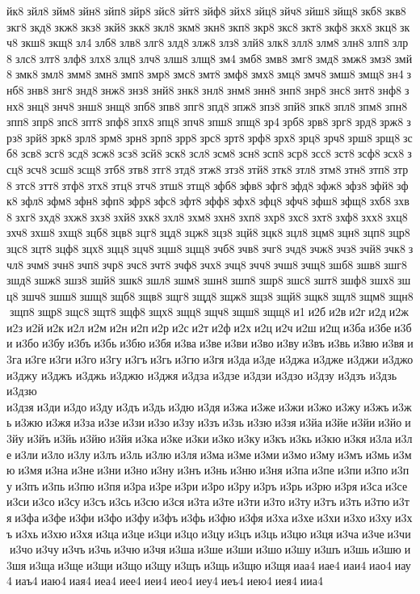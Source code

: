 йк8 зйл8 зйм8 зйн8 зйп8 зйр8 зйс8 зйт8 зйф8 зйх8 зйц8 зйч8 зйш8 зйщ8 зкб8 зкв8 зкг8 зкд8 зкж8 зкз8 зкй8 зкк8 зкл8 зкм8 зкн8 зкп8 зкр8 зкс8 зкт8 зкф8 зкх8 зкц8 зкч8 зкш8 зкщ8 зл4 злб8 злв8 злг8 злд8 злж8 злз8 злй8 злк8 злл8 злм8 злн8 злп8 злр8 злс8 злт8 злф8 злх8 злц8 злч8 злш8 злщ8 зм4 змб8 змв8 змг8 змд8 змж8 змз8 змй8 змк8 змл8 змм8 змн8 змп8 змр8 змс8 змт8 змф8 змх8 змц8 змч8 змш8 змщ8 зн4 знб8 знв8 знг8 знд8 знж8 знз8 знй8 знк8 знл8 знм8 знн8 знп8 знр8 знс8 знт8 знф8 знх8 знц8 знч8 знш8 знщ8 зпб8 зпв8 зпг8 зпд8 зпж8 зпз8 зпй8 зпк8 зпл8 зпм8 зпн8 зпп8 зпр8 зпс8 зпт8 зпф8 зпх8 зпц8 зпч8 зпш8 зпщ8 зр4 зрб8 зрв8 зрг8 зрд8 зрж8 зрз8 зрй8 зрк8 зрл8 зрм8 зрн8 зрп8 зрр8 зрс8 зрт8 зрф8 зрх8 зрц8 зрч8 зрш8 зрщ8 зсб8 зсв8 зсг8 зсд8 зсж8 зсз8 зсй8 зск8 зсл8 зсм8 зсн8 зсп8 зср8 зсс8 зст8 зсф8 зсх8 зсц8 зсч8 зсш8 зсщ8 зтб8 зтв8 зтг8 зтд8 зтж8 зтз8 зтй8 зтк8 зтл8 зтм8 зтн8 зтп8 зтр8 зтс8 зтт8 зтф8 зтх8 зтц8 зтч8 зтш8 зтщ8 зфб8 зфв8 зфг8 зфд8 зфж8 зфз8 зфй8 зфк8 зфл8 зфм8 зфн8 зфп8 зфр8 зфс8 зфт8 зфф8 зфх8 зфц8 зфч8 зфш8 зфщ8 зхб8 зхв8 зхг8 зхд8 зхж8 зхз8 зхй8 зхк8 зхл8 зхм8 зхн8 зхп8 зхр8 зхс8 зхт8 зхф8 зхх8 зхц8 зхч8 зхш8 зхщ8 зцб8 зцв8 зцг8 зцд8 зцж8 зцз8 зцй8 зцк8 зцл8 зцм8 зцн8 зцп8 зцр8 зцс8 зцт8 зцф8 зцх8 зцц8 зцч8 зцш8 зцщ8 зчб8 зчв8 зчг8 зчд8 зчж8 зчз8 зчй8 зчк8 зчл8 зчм8 зчн8 зчп8 зчр8 зчс8 зчт8 зчф8 зчх8 зчц8 зчч8 зчш8 зчщ8 зшб8 зшв8 зшг8 зшд8 зшж8 зшз8 зшй8 зшк8 зшл8 зшм8 зшн8 зшп8 зшр8 зшс8 зшт8 зшф8 зшх8 зшц8 зшч8 зшш8 зшщ8 зщб8 зщв8 зщг8 зщд8 зщж8 зщз8 зщй8 зщк8 зщл8 зщм8 зщн8 зщп8 зщр8 зщс8 зщт8 зщф8 зщх8 зщц8 зщч8 зщш8 зщщ8 и1 и2б и2в и2г и2д и2ж и2з и2й и2к и2л и2м и2н и2п и2р и2с и2т и2ф и2х и2ц и2ч и2ш и2щ и3ба и3бе и3би и3бо и3бу и3бъ и3бь и3бю и3бя и3ва и3ве и3ви и3во и3ву и3въ и3вь и3вю и3вя и3га и3ге и3ги и3го и3гу и3гъ и3гь и3гю и3гя и3да и3де 	и3джа 	и3дже 	и3джи 	и3джо 	и3джу 	и3джъ 	и3джь 	и3джю 	и3джя 	и3дза 	и3дзе 	и3дзи 	и3дзо 	и3дзу 	и3дзъ 	и3дзь 	и3дзю 	и3дзя и3ди и3до и3ду и3дъ и3дь и3дю и3дя и3жа и3же и3жи и3жо и3жу и3жъ и3жь и3жю и3жя и3за и3зе и3зи и3зо и3зу и3зъ и3зь и3зю и3зя и3йа и3йе и3йи и3йо и3йу и3йъ и3йь и3йю и3йя и3ка и3ке и3ки и3ко и3ку и3къ и3кь и3кю и3кя и3ла и3ле и3ли и3ло и3лу и3лъ и3ль и3лю и3ля и3ма и3ме и3ми и3мо и3му и3мъ и3мь и3мю и3мя и3на и3не и3ни и3но и3ну и3нъ и3нь и3ню и3ня и3па и3пе и3пи и3по и3пу и3пъ и3пь и3пю и3пя и3ра и3ре и3ри и3ро и3ру и3ръ и3рь и3рю и3ря и3са и3се и3си и3со и3су и3съ и3сь и3сю и3ся и3та и3те и3ти и3то и3ту и3тъ и3ть и3тю и3тя и3фа и3фе и3фи и3фо и3фу и3фъ и3фь и3фю и3фя и3ха и3хе и3хи и3хо и3ху и3хъ и3хь и3хю и3хя и3ца и3це и3ци и3цо и3цу и3цъ и3ць и3цю и3ця и3ча и3че и3чи и3чо и3чу и3чъ и3чь и3чю и3чя и3ша и3ше и3ши и3шо и3шу и3шъ и3шь и3шю и3шя и3ща и3ще и3щи и3що и3щу и3щъ и3щь и3щю и3щя иаа4 иае4 иаи4 иао4 иау4 иаъ4 иаю4 иая4 иеа4 иее4 иеи4 иео4 иеу4 иеъ4 иею4 иея4 ииа4